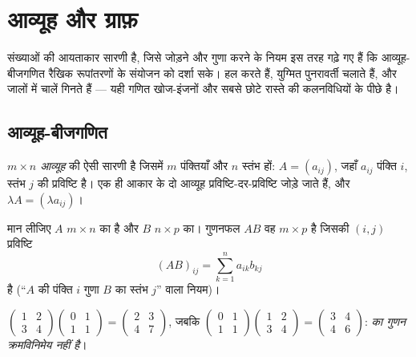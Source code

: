 \chapter{आव्यूह और ग्राफ़}\label{ch:g12:matrix}

 संख्याओं की आयताकार सारणी है, जिसे जोड़ने और गुणा करने के नियम इस तरह
गढ़े गए हैं कि आव्यूह-बीजगणित रैखिक रूपांतरणों के संयोजन को दर्शा सके। 
 हल करते हैं, युग्मित पुनरावर्ती  चलाते हैं, और जालों में
चालें गिनते हैं --- यही गणित खोज-इंजनों और सबसे छोटे रास्ते की कलनविधियों के
पीछे है।

\section{आव्यूह-बीजगणित}

\begin{definition}[आव्यूह]\label{def:g12:matrix:matrix}
\emph{$m \times n$ आव्यूह}  की ऐसी सारणी है जिसमें $m$
पंक्तियाँ और $n$ स्तंभ हों:
$A = (a_{ij})$, जहाँ $a_{ij}$ पंक्ति $i$, स्तंभ $j$ की प्रविष्टि है। एक ही आकार के दो आव्यूह
प्रविष्टि-दर-प्रविष्टि जोड़े जाते हैं, और $\lambda A = (\lambda a_{ij})$।
\end{definition}

\begin{definition}[आव्यूह गुणनफल]\label{def:g12:matrix:product}
मान लीजिए $A$ $m \times n$ का है और $B$ $n \times p$ का। गुणनफल $AB$ वह $m \times p$  है
जिसकी $(i,j)$ प्रविष्टि
\[
(AB)_{ij} = \sum_{k=1}^{n} a_{ik} b_{kj}
\]
है (``$A$ की पंक्ति $i$ गुणा $B$ का स्तंभ $j$'' वाला नियम)।
\end{definition}

\begin{example}
$\begin{pmatrix} 1 & 2\\ 3 & 4\end{pmatrix}
\begin{pmatrix} 0 & 1\\ 1 & 1\end{pmatrix}
= \begin{pmatrix} 2 & 3\\ 4 & 7\end{pmatrix}$, \quad जबकि \quad $\begin{pmatrix} 0 & 1\\ 1 & 1\end{pmatrix}
\begin{pmatrix} 1 & 2\\ 3 & 4\end{pmatrix}
= \begin{pmatrix} 3 & 4\\ 4 & 6\end{pmatrix}$: \emph{ का गुणन क्रमविनिमेय नहीं है}।
\end{example}

